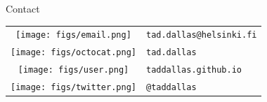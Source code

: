 \documentclass[12pt]{beamer}
\begin{document}
\begin{frame}

{\large \textcolor{recRed}{Contact}}

  \begin{flushright}
    \begin{tabular}{cl}
		  \texttt{[image: figs/email.png]} & \texttt{tad.dallas@helsinki.fi} \\
		  \texttt{[image: figs/octocat.png]} & \texttt{tad.dallas} \\
		  \texttt{[image: figs/user.png]} & \texttt{taddallas.github.io}\\
		  \texttt{[image: figs/twitter.png]} & \texttt{@taddallas} \\
   \end{tabular}
  \end{flushright}
\end{frame}
\end{document}
